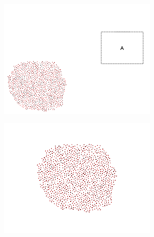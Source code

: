 \begin{minipage}{\linewidth}
	\centering	
	\begin{minipage}{0.42\linewidth}
		\includegraphics[width=\linewidth]{../ui_experiment/slide_images/Swarm_Robot_Control_-_1000_Robot_0035.png}
		\label{fig:sub1}
	\end{minipage}
	\begin{minipage}{0.42\linewidth}
		\includegraphics[width=\linewidth]{../ui_experiment/slide_images/Swarm_Robot_Control_-_1000_Robot_0037.png}
		\label{fig:sub2}
	\end{minipage}
	\label{fig:1000_robot_slides}
\end{minipage}

